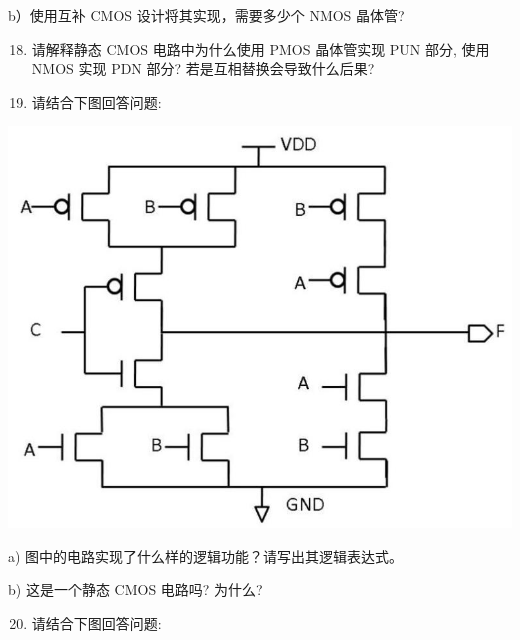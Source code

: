 \documentclass[10pt]{article}
\begin{document}
b）使用互补 CMOS 设计将其实现，需要多少个 NMOS 晶体管?

\begin{enumerate}
  \setcounter{enumi}{17}
  \item 请解释静态 $\mathrm{CMOS}$ 电路中为什么使用 PMOS 晶体管实现 PUN 部分, 使用 NMOS 实现 PDN 部分? 若是互相替换会导致什么后果?

  \item 请结合下图回答问题:

\end{enumerate}

\begin{center}
\includegraphics[max width=\textwidth]{2024_05_20_f1af48ad54173fe448ecg-5}
\end{center}

a) 图中的电路实现了什么样的逻辑功能？请写出其逻辑表达式。

b) 这是一个静态 CMOS 电路吗? 为什么?

\begin{enumerate}
  \setcounter{enumi}{19}
  \item 请结合下图回答问题:
\end{enumerate}
\end{document}
